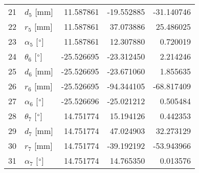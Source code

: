 \documentclass{standalone}%
\begin{document}
\begin{tabular}{llrrr}
21 &              $d_{5}$ [mm] &  11.587861 &  -19.552885 &  -31.140746 \\
22 &              $r_{5}$ [mm] &  11.587861 &   37.073886 &   25.486025 \\
23 &  $\alpha_{5}$ [$\degree$] &  11.587861 &   12.307880 &    0.720019 \\
24 &  $\theta_{6}$ [$\degree$] & -25.526695 &  -23.312450 &    2.214246 \\
25 &              $d_{6}$ [mm] & -25.526695 &  -23.671060 &    1.855635 \\
26 &              $r_{6}$ [mm] & -25.526695 &  -94.344105 &  -68.817409 \\
27 &  $\alpha_{6}$ [$\degree$] & -25.526696 &  -25.021212 &    0.505484 \\
28 &  $\theta_{7}$ [$\degree$] &  14.751774 &   15.194126 &    0.442353 \\
29 &              $d_{7}$ [mm] &  14.751774 &   47.024903 &   32.273129 \\
30 &              $r_{7}$ [mm] &  14.751774 &  -39.192192 &  -53.943966 \\
31 &  $\alpha_{7}$ [$\degree$] &  14.751774 &   14.765350 &    0.013576 \\
\bottomrule
\end{tabular}
%
\end{document}
